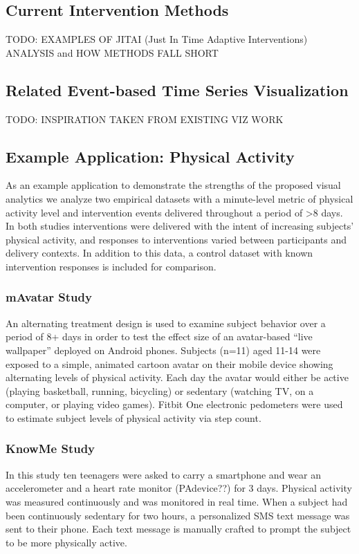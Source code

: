 \documentclass[review,journal]{vgtc}         %
\begin{document}
\subsection{Current Intervention Methods}
TODO: EXAMPLES OF JITAI (Just In Time Adaptive Interventions) ANALYSIS and HOW METHODS FALL SHORT

\subsection{Related Event-based Time Series Visualization}
TODO: INSPIRATION TAKEN FROM EXISTING VIZ WORK


\subsection{Example Application: Physical Activity}
As an example application to demonstrate the strengths of the proposed visual analytics we analyze two empirical datasets with a minute-level metric of physical activity level and intervention events delivered throughout a period of >8 days.
In both studies interventions were delivered with the intent of increasing subjects’ physical activity, and responses to interventions varied between participants and delivery contexts.
In addition to this data, a control dataset with known intervention responses is included for comparison.

\subsubsection{mAvatar Study}
An alternating treatment design is used to examine subject behavior over a period of 8+ days in order to test the effect size of an avatar-based “live wallpaper” deployed on Android phones.
Subjects (n=11) aged 11-14 were exposed to a simple, animated cartoon avatar on their mobile device showing alternating levels of physical activity.
Each day the avatar would either be active (playing basketball, running, bicycling) or sedentary (watching TV, on a computer, or playing video games).
Fitbit One electronic pedometers were used to estimate subject levels of physical activity via step count.

\subsubsection{KnowMe Study}
In this study ten teenagers were asked to carry a smartphone and wear an accelerometer and a heart rate monitor (PAdevice??) for 3 days.
Physical activity was measured continuously and was monitored in real time.
When a subject had been continuously sedentary for two hours, a personalized SMS text message was sent to their phone.
Each text message is manually crafted to prompt the subject to be more physically active.
\end{document}
